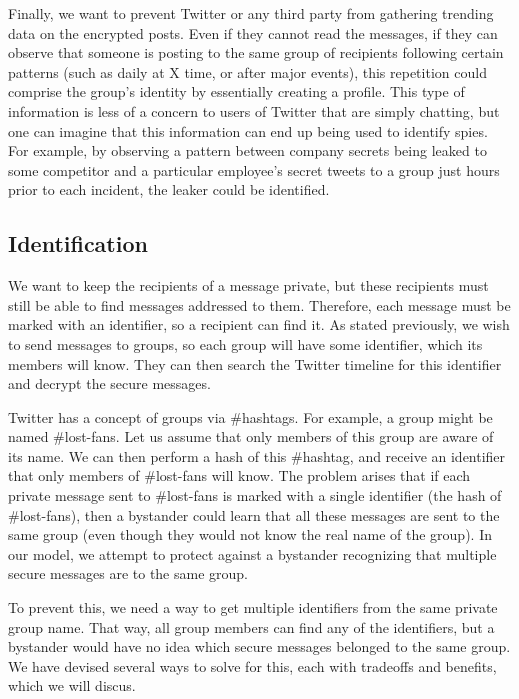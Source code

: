 \documentclass{article}
\begin{document}
Finally, we want to prevent Twitter or any third party from gathering trending data on the encrypted posts. Even if they cannot read the messages, if they can observe that someone is posting to the same group of recipients following certain patterns (such as daily at X time, or after major events), this repetition could comprise the group’s identity by essentially creating a profile. This type of information is less of a concern to users of Twitter that are simply chatting, but one can imagine that this information can end up being used to identify spies. For example, by observing a pattern between company secrets being leaked to some competitor and a particular employee's secret tweets to a group just hours prior to each incident, the leaker could be identified.

\subsection*{Identification}

We want to keep the recipients of a message private, but these recipients must still be able to find messages addressed to them. Therefore, each message must be marked with an identifier, so a recipient can find it. As stated previously, we wish to send messages to groups, so each group will have some identifier, which its members will know. They can then search the Twitter timeline for this identifier and decrypt the secure messages.

Twitter has a concept of groups via \#hashtags. For example, a group might be named \#lost-fans. Let us assume that only members of this group are aware of its name. We can then perform a hash of this \#hashtag, and receive an identifier that only members of \#lost-fans will know. The problem arises that if each private message sent to \#lost-fans is marked with a single identifier (the hash of \#lost-fans), then a bystander could learn that all these messages are sent to the same group (even though they would not know the real name of the group). In our model, we attempt to protect against a bystander recognizing that multiple secure messages are to the same group.

To prevent this, we need a way to get multiple identifiers from the same private group name. That way, all group members can find any of the identifiers, but a bystander would have no idea which secure messages belonged to the same group. We have devised several ways to solve for this, each with tradeoffs and benefits, which we will discus.
\end{document}
